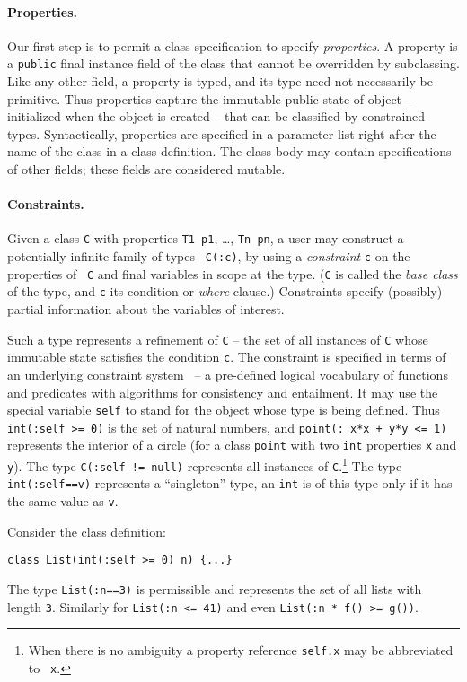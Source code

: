 \paragraph{Properties.}
Our first step is to permit a class specification to specify {\em
properties}. A property is a {\tt public} final instance field of the
class that cannot be overridden by subclassing. Like any other field,
a property is typed, and its type need not necessarily be
primitive. Thus properties capture the immutable public state of
object -- initialized when the object is created -- that can be
classified by constrained types. Syntactically, properties are
specified in a parameter list right after the name of the class in a
class definition. The class body may contain specifications of other
fields; these fields are considered mutable.

\paragraph{Constraints.}
Given a class {\tt C} with properties {\tt T1 p1}, \ldots, {\tt Tn
pn}, a user may construct a potentially infinite family of types {\tt
C(:c)}, by using a {\em constraint} {\tt c} on the properties of {\tt
C} and final variables in scope at the type. ({\tt C} is called the
{\em base class} of the type, and {\tt c} its condition or {\em where}
clause.)  Constraints specify (possibly) partial information about the
variables of interest. 

Such a type represents a refinement of {\tt C} -- the set of all
instances of {\tt C} whose immutable state satisfies the condition
{\tt c}.  The constraint is specified in terms of an underlying
constraint system~\cite{CCCC} -- a pre-defined logical vocabulary of
functions and predicates with algorithms for consistency and
entailment.  It may use the special variable {\tt self} to stand for
the object whose type is being defined. Thus {\tt int(:self >= 0)} is
the set of natural numbers, and {\tt point(: x*x + y*y <= 1)}
represents the interior of a circle (for a class {\tt point} with two
{\tt int} properties {\tt x} and {\tt y}). The type {\tt C(:self !=
null)} represents all instances of {\tt C}.\footnote{When there is no
ambiguity a property reference {\tt self.x} may be abbreviated to {\tt
x}.} The type {\tt int(:self==v)} represents a ``singleton'' type, an
{\tt int} is of this type only if it has the same value as {\tt v}.

\begin{example}	
Consider the class definition:
{\footnotesize
\begin{verbatim}
class List(int(:self >= 0) n) {...}
\end{verbatim}}
The type {\tt List(:n==3)} is permissible and represents the set of
all lists with length {\tt 3}. Similarly for {\tt List(:n <= 41)}
and even {\tt List(:n * f() >= g())}.
\end{example}

